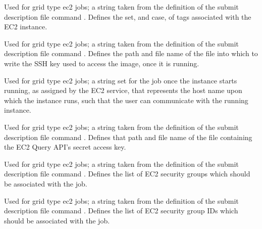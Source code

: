 \begin{description}
\item[\AdAttr{EC2TagNames}:] 
Used for grid type ec2 jobs;
a string taken from the definition of the submit description file command
.
Defines the set, and case, of tags associated with the EC2 instance. 

\item[\AdAttr{EC2KeyPairFile}:] 
Used for grid type ec2 jobs;
a string taken from the definition of the submit description file command
.
Defines the path and file name of the file 
into which to write the SSH key used to access the image, once it is running. 

\item[\AdAttr{EC2RemoteVirtualMachineName}:] 
Used for grid type ec2 jobs;
a string set for the job once the instance starts running, 
as assigned by the EC2 service, that represents
the host name upon which the instance runs, such that the
user can communicate with the running instance.

\item[\AdAttr{EC2SecretAccessKey}:] 
Used for grid type ec2 jobs;
a string taken from the definition of the submit description file command
.
Defines that path and file name of the file 
containing the EC2 Query API's secret access key.

\item[\AdAttr{EC2SecurityGroups}:] 
Used for grid type ec2 jobs;
a string taken from the definition of the submit description file command
.
Defines the list of EC2 security groups which should be associated with the job.

\item[\AdAttr{EC2SecurityIDs}:] 
Used for grid type ec2 jobs;
a string taken from the definition of the submit description file command
.
Defines the list of EC2 security group IDs which should be associated with the job.


\end{description}
